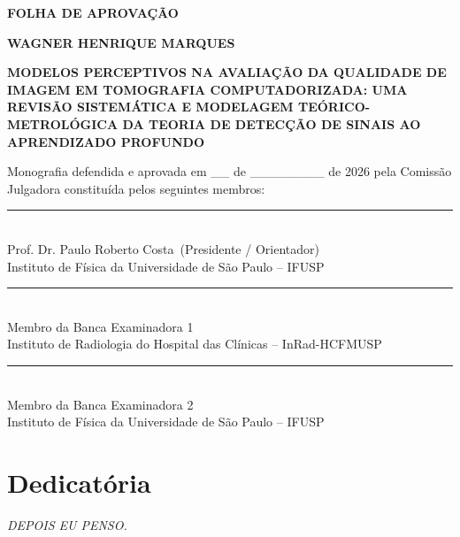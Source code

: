 \documentclass[
  12pt,
  a4paper,
  oneside
]{report}
\newcommand{\tccautor}{WAGNER HENRIQUE MARQUES}
\newcommand{\tcctitulo}{MODELOS PERCEPTIVOS NA AVALIAÇÃO DA QUALIDADE DE IMAGEM EM TOMOGRAFIA COMPUTADORIZADA: UMA REVISÃO SISTEMÁTICA E MODELAGEM TEÓRICO-METROLÓGICA DA TEORIA DE DETECÇÃO DE SINAIS AO APRENDIZADO PROFUNDO}
\newcommand{\tccorientador}{Prof. Dr. Paulo Roberto Costa}
\begin{document}
\begin{center}
  {\bfseries\Large FOLHA DE APROVAÇÃO \par}
  
  \vspace{1.5cm}
  
  {\bfseries\large \tccautor \par}
  
  \vspace{0.8cm}
  
  {\bfseries \tcctitulo \par}

  \vspace{1.5cm}

  \begin{flushright}
    \begin{minipage}{0.55\textwidth}
      \small\raggedright
      Monografia defendida e aprovada em \_\_ de \_\_\_\_\_\_\_\_ de 2026 pela Comissão Julgadora constituída pelos seguintes membros:
    \end{minipage}
  \end{flushright}

  \vspace{2.5cm}

  \rule{0.85\textwidth}{0.5pt}\\
  \tccorientador\ (Presidente / Orientador)\\
  Instituto de Física da Universidade de São Paulo -- IFUSP

  \vspace{1.2cm}

  \rule{0.85\textwidth}{0.5pt}\\
  Membro da Banca Examinadora 1\\
  Instituto de Radiologia do Hospital das Clínicas -- InRad-HCFMUSP

  \vspace{1.2cm}

  \rule{0.85\textwidth}{0.5pt}\\
  Membro da Banca Examinadora 2\\
  Instituto de Física da Universidade de São Paulo -- IFUSP
\end{center}
\clearpage

\chapter*{Dedicatória}
\vspace*{\fill}
\begin{flushright}
  \textit{DEPOIS EU PENSO.}
\end{flushright}
\clearpage
\end{document}
